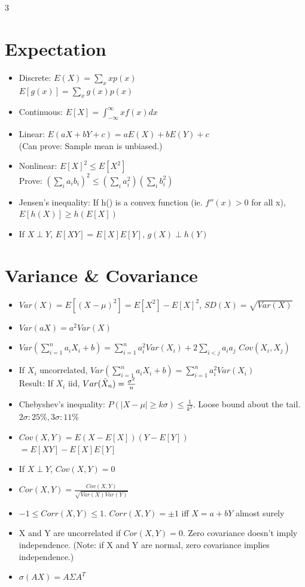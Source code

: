 \documentclass[a4paper,10pt]{article}
\begin{document}
\begin{multicols}{3}
\section*{Expectation}
\begin{itemize}
    \item Discrete: $E(X)=\sum_xxp(x)$\\
    $E[g(x)]=\sum_xg(x)p(x)$
    \item Continuous: $E[X]=\int_{-\infty}^\infty xf(x)dx$
    \item Linear: $E(aX+bY+c)=aE(X)+bE(Y)+c$\\
    (Can prove: Sample mean is unbiased.)
    \item Nonlinear: $E[X]^2\le E[X^2]$ \\Prove: $(\sum_i a_ib_i)^2\le(\sum_ia_i^2)(\sum_ib_i^2)$
    \item Jensen's inequality: If h() is a convex function (ie. $f''(x)>0$ for all x), $E[h(X)]\ge h(E[X])$
    \item If $X\perp Y$, $E[XY]=E[X]E[Y]$, $g(X)\perp h(Y)$
    
\end{itemize}

\section*{Variance \& Covariance}
\begin{itemize}
    \item $Var(X)=E[(X-\mu)^2]=E[X^2]-E[X]^2$, $SD(X)=\sqrt{Var(X)}$
    \item $Var(aX)=a^2Var(X)$
    \item $Var(\sum_{i=1}^n a_i X_i+b)=\sum_{i=1}^na_i^2Var(X_i) + 2\sum_{i<j}a_ia_j$ $Cov(X_i,X_j)$
    \item If $X_i$ uncorrelated, $Var(\sum_{i=1}^n a_i X_i+b)=\sum_{i=1}^na_i^2Var(X_i)$\\
    Result: If $X_i$ iid, $Var(\Bar{X}_n)=\frac{\sigma^2}{n}$
    \item Chebyshev's inequality: $P(|X-\mu|\ge k\sigma)\le \frac{1}{k^2}$. Loose bound about the tail. 
    $2\sigma:25\%, 3\sigma:11\%$
    \item $Cov(X,Y)=E{(X-E[X])(Y-E[Y])}$\\ $=E[XY]-E[X]E[Y]$
    \item If $X \perp Y$, $Cov(X,Y)=0$
    \item $Cor(X,Y)=\frac{Cov(X,Y)}{\sqrt{Var(X)Var(Y)}}$
    \item $-1\le Corr(X,Y)\le 1$. $Corr(X,Y)=\pm 1$ iff $X=a+bY$ almost surely
    \item X and Y are uncorrelated if $Cor(X,Y)=0$. Zero covariance doesn't imply independence. (Note: if X and Y are normal, zero covariance implies independence.)
    \item $\sigma(AX)=A\Sigma A^T$
    

\end{itemize}
\end{multicols}
\end{document}
